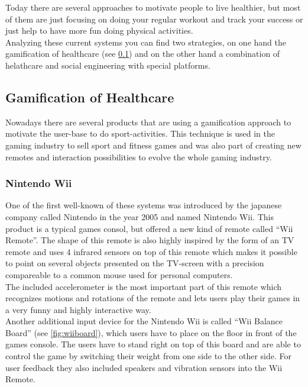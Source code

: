\documentclass[a4paper,11pt]{article}
\begin{document}
Today there are several approaches to motivate people to live healthier, but most of them are just focusing on doing your regular workout and track your success or just help to have more fun doing physical activities. \\

Analyzing these current systems you can find two strategies, on one hand the gamification of healthcare (see \ref{sect:star:gamification}) and on the other hand a combination of helathcare and social engineering with special platforms.


\subsection{Gamification of Healthcare}
\label{sect:star:gamification}
Nowadays there are several products that are using a gamification approach to motivate the user-base to do sport-activities. This technique is used in the gaming industry to sell sport and fitness games and was also part of creating new remotes and interaction possibilities to evolve the whole gaming industry.

\subsubsection{Nintendo Wii}
\label{sect:star:wii}
One of the first well-known of these systems was introduced by the japanese company called Nintendo in the year 2005 and named Nintendo Wii. This product is a typical games consol, but offered a new kind of remote called ``Wii Remote''. The shape of this remote is also highly inspired by the form of an TV remote and uses 4 infrared sensors on top of this remote which makes it possible to point on several objects presented on the TV-screen with a precision compareable to a common mouse used for personal computers. \\

The included accelerometer is the most important part of this remote which recognizes motions and rotations of the remote and lets users play their games in a very funny and highly interactive way. \\

Another additional input device for the Nintendo Wii is called ``Wii Balance Board'' (see \ref{fig:wiiboard}), which users have to place on the floor in front of the games console. The users have to stand right on top of this board and are able to control the game by switching their weight from one side to the other side.
For user feedback they also included speakers and vibration sensors into the Wii Remote. \\
\end{document}
